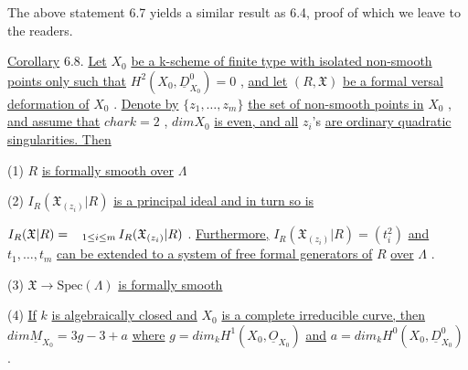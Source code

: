 The above statement 6.7 yields a similar result as 6.4, proof of which we leave to the readers.

\underline{Corollary} 6.8.  \underline{Let}  $X_0$  \underline{be a k-scheme of finite type with isolated non-smooth points only such that}  $H^2(X_0, \underline{D}^0_{X_0}) = 0$  , \underline{and let}  $(R, \mathfrak{X})$  \underline{be a formal versal deformation of}  $X_0$  . \underline{Denote by}  $\{z_1, \ldots, z_m\}$  \underline{the set of non-smooth points in} $X_0$  , \underline{and assume that}  $char k = 2$  , $dim X_0$  \underline{is even, and all}  $z_i$'s  \underline{are ordinary quadratic singularities. Then}

(1)  $R$  \underline{is formally smooth over}  $\Lambda$

(2)  $I_R(\mathfrak{X}_{(z_i)}|R)$  \underline{is a principal ideal and in turn so is}

$I_R(\mathfrak{X}|R) = \mathop{\hphantom{\bigcap}}_{1 \leq i \leq m} I_R(\mathfrak{X}_{(z_i)}|R)$  . \underline{Furthermore,}  $I_R(\mathfrak{X}_{(z_i)}|R) = (t_i^2)$  \underline{and} $t_1, \ldots , t_m$  \underline{can be extended to a system of free formal generators of}  $R$  \underline{over} $\Lambda$  .

(3)  $\mathfrak{X} \to \mathrm{Spec}(\Lambda)$  \underline{is formally smooth}

(4)  \underline{If}  $k$  \underline{is algebraically closed and}  $X_0$  \underline{is a complete irreducible curve, then}  $dim \underline{M}_{X_0} = 3g - 3 + a$  \underline{where}  $g = dim_k H^1(X_0, \underline{O}_{X_0})$  \underline{and} $a = dim_k H^0(X_0, \underline{D}^0_{X_0})$  .
